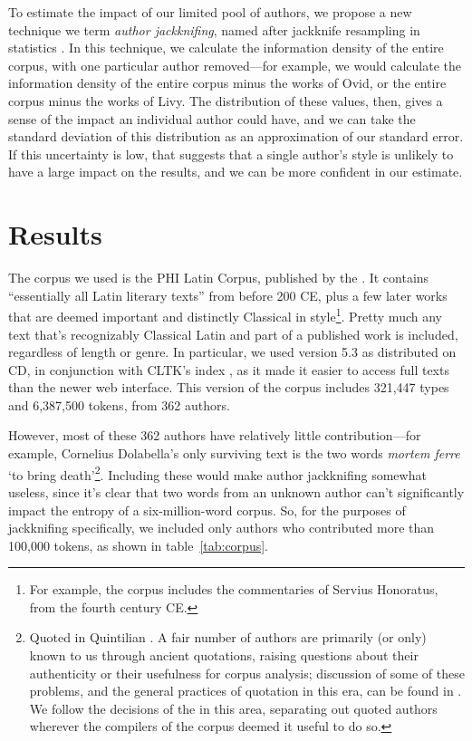 \documentclass[12pt,twoside]{article}
\begin{document}
To estimate the impact of our limited pool of authors, we propose a new technique we term \emph{author jackknifing}, named after jackknife resampling in statistics \citep{efron}. In this technique, we calculate the information density of the entire corpus, with one particular author removed---for example, we would calculate the information density of the entire corpus minus the works of Ovid, or the entire corpus minus the works of Livy. The distribution of these values, then, gives a sense of the impact an individual author could have, and we can take the standard deviation of this distribution as an approximation of our standard error. If this uncertainty is low, that suggests that a single author's style is unlikely to have a large impact on the results, and we can be more confident in our estimate.

\section{Results}
\label{sec:res}

The corpus we used is the PHI Latin Corpus, published by the \citet{phi}. It contains ``essentially all Latin literary texts'' from before 200 CE, plus a few later works that are deemed important and distinctly Classical in style\footnote{For example, the corpus includes the commentaries of Servius Honoratus, from the fourth century CE.}. Pretty much any text that's recognizably Classical Latin and part of a published work is included, regardless of length or genre. In particular, we used version 5.3 as distributed on CD, in conjunction with CLTK's index \citep{cltk}, as it made it easier to access full texts than the newer web interface. This version of the corpus includes 321,447 types and 6,387,500 tokens, from 362 authors.

However, most of these 362 authors have relatively little contribution---for example, Cornelius Dolabella's only surviving text is the two words \emph{mortem ferre} `to bring death'\footnote{Quoted in Quintilian \citep[VIII.2.4]{quintilian}. A fair number of authors are primarily (or only) known to us through ancient quotations, raising questions about their authenticity or their usefulness for corpus analysis; discussion of some of these problems, and the general practices of quotation in this era, can be found in \citet{vandenhoek}. We follow the decisions of the \citeauthor{phi} in this area, separating out quoted authors wherever the compilers of the corpus deemed it useful to do so.}. Including these would make author jackknifing somewhat useless, since it's clear that two words from an unknown author can't significantly impact the entropy of a six-million-word corpus. So, for the purposes of jackknifing specifically, we included only authors who contributed more than 100,000 tokens, as shown in table~\ref{tab:corpus}.
\end{document}
